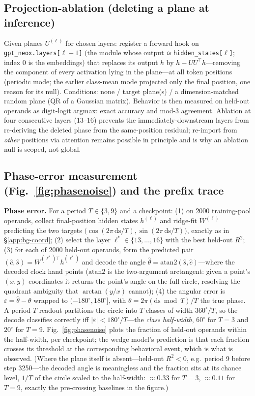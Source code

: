 \documentclass{article} %
\begin{document}
\subsection{Projection-ablation (deleting a plane at inference)}
Given planes $U^{(\ell)}$ for chosen layers: register a forward hook on \texttt{gpt\_neox.layers[$\ell{-}1$]} (the module whose output \emph{is} \texttt{hidden\_states[$\ell$]}; index 0 is the embeddings) that replaces its output $h$ by $h - U U^\top h$---removing the component of every activation lying in the plane---at all token positions (periodic mode; the earlier class-mean mode projected only the final position, one reason for its null). Conditions: none / target plane(s) / a dimension-matched random plane (QR of a Gaussian matrix). Behavior is then measured on held-out operands as digit-logit argmax: exact accuracy and mod-3 agreement. Ablation at four consecutive layers (13--16) prevents the immediately-downstream layers from re-deriving the deleted phase from the same-position residual; re-import from \emph{other} positions via attention remains possible in principle and is why an ablation null is scoped, not global.

\subsection{Phase-error measurement (Fig.~\ref{fig:phasenoise}) and the prefix trace}
\label{app:proc-phase}

\textbf{Phase error.} For a period $T \in \{3, 9\}$ and a checkpoint: (1) on 2000 training-pool operands, collect final-position hidden states $h^{(\ell)}$ and ridge-fit $W^{(\ell)}$ predicting the two targets $\big(\cos(2\pi\,\mathrm{ds}/T), \sin(2\pi\,\mathrm{ds}/T)\big)$, exactly as in \S\ref{app:bg-coord}; (2) select the layer $\ell^\ast \in \{13,\dots,16\}$ with the best held-out $R^2$; (3) for each of 2000 held-out operands, form the predicted pair $(\hat{c}, \hat{s}) = W^{(\ell^\ast)\top} h^{(\ell^\ast)}$ and decode the angle $\hat{\theta} = \mathrm{atan2}(\hat{s}, \hat{c})$---where the decoded clock hand points ($\mathrm{atan2}$ is the two-argument arctangent: given a point's $(x, y)$ coordinates it returns the point's angle on the full circle, resolving the quadrant ambiguity that $\arctan(y/x)$ cannot); (4) the angular error is $\varepsilon = \hat{\theta} - \theta$ wrapped to $(-180^\circ, 180^\circ]$, with $\theta = 2\pi (\mathrm{ds} \bmod T)/T$ the true phase. A period-$T$ readout partitions the circle into $T$ classes of width $360^\circ/T$, so the decode classifies correctly iff $|\varepsilon| < 180^\circ/T$---the \emph{class half-width}, $60^\circ$ for $T{=}3$ and $20^\circ$ for $T{=}9$. Fig.~\ref{fig:phasenoise} plots the fraction of held-out operands within the half-width, per checkpoint; the wedge model's prediction is that each fraction crosses its threshold at the corresponding behavioral event, which is what is observed. (Where the plane itself is absent---held-out $R^2 < 0$, e.g.\ period 9 before step 3250---the decoded angle is meaningless and the fraction sits at its chance level, $1/T$ of the circle scaled to the half-width: $\approx 0.33$ for $T{=}3$, $\approx 0.11$ for $T{=}9$, exactly the pre-crossing baselines in the figure.)
\end{document}
